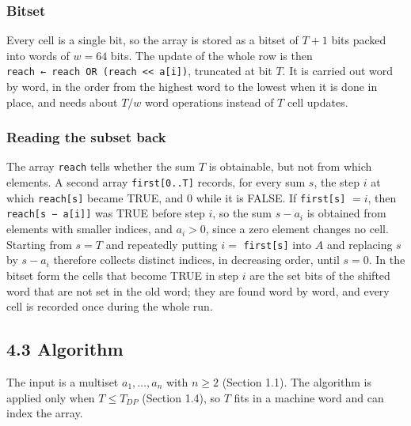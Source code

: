 \documentclass[
]{article}
\begin{document}
\hypertarget{bitset}{%
\subsubsection{Bitset}\label{bitset}}

Every cell is a single bit, so the array is stored as a bitset of
\(T + 1\) bits packed into words of \(w = 64\) bits. The update of the
whole row is then
\texttt{reach\ ←\ reach\ OR\ (reach\ \textless{}\textless{}\ a{[}i{]})},
truncated at bit \(T\). It is carried out word by word, in the order
from the highest word to the lowest when it is done in place, and needs
about \(T/w\) word operations instead of \(T\) cell updates.

\hypertarget{reading-the-subset-back}{%
\subsubsection{Reading the subset back}\label{reading-the-subset-back}}

The array \texttt{reach} tells whether the sum \(T\) is obtainable, but
not from which elements. A second array \texttt{first{[}0..T{]}}
records, for every sum \(s\), the step \(i\) at which
\texttt{reach{[}s{]}} became TRUE, and \(0\) while it is FALSE. If
\texttt{first{[}s{]}} \(= i\), then \texttt{reach{[}s\ −\ a{[}i{]}{]}}
was TRUE before step \(i\), so the sum \(s - a_i\) is obtained from
elements with smaller indices, and \(a_i > 0\), since a zero element
changes no cell. Starting from \(s = T\) and repeatedly putting \(i =\)
\texttt{first{[}s{]}} into \(A\) and replacing \(s\) by \(s - a_i\)
therefore collects distinct indices, in decreasing order, until
\(s = 0\). In the bitset form the cells that become TRUE in step \(i\)
are the set bits of the shifted word that are not set in the old word;
they are found word by word, and every cell is recorded once during the
whole run.

\hypertarget{algorithm-2}{%
\subsection{4.3 Algorithm}\label{algorithm-2}}

The input is a multiset \(a_1, \dots, a_n\) with \(n \ge 2\) (Section
1.1). The algorithm is applied only when \(T \le T_{DP}\) (Section 1.4),
so \(T\) fits in a machine word and can index the array.
\end{document}

